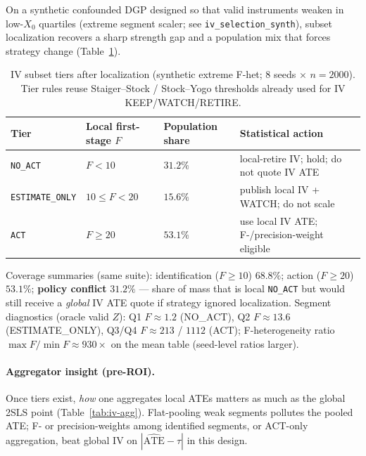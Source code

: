 On a synthetic confounded DGP designed so that valid instruments weaken in
low-$X_0$ quartiles (extreme segment scaler; see
\texttt{iv\_selection\_synth}), subset localization recovers a sharp
strength gap and a population mix that forces strategy change
(Table~\ref{tab:iv-tiers}).

\begin{table}[H]
\centering
\small
\caption{IV subset tiers after localization (synthetic extreme F-het;
8 seeds $\times$ $n{=}2000$). Tier rules reuse Staiger--Stock / Stock--Yogo
thresholds already used for IV KEEP/WATCH/RETIRE.}
\label{tab:iv-tiers}
\begin{tabular}{@{}llll@{}}
\toprule
Tier & Local first-stage $F$ & Population share & Statistical action \\
\midrule
\texttt{NO\_ACT} & $F<10$ & $31.2\%$ & local-retire IV; hold; do not quote IV ATE \\
\texttt{ESTIMATE\_ONLY} & $10\le F<20$ & $15.6\%$ & publish local IV + WATCH; do not scale \\
\texttt{ACT} & $F\ge 20$ & $53.1\%$ & use local IV ATE; F-/precision-weight eligible \\
\bottomrule
\end{tabular}
\end{table}

\noindent Coverage summaries (same suite): identification ($F\ge 10$)
$68.8\%$; action ($F\ge 20$) $53.1\%$;
\textbf{policy conflict} $31.2\%$ --- share of mass that is local
\texttt{NO\_ACT} but would still receive a \emph{global} IV ATE quote if
strategy ignored localization.
Segment diagnostics (oracle valid $Z$): Q1 $F\approx 1.2$ (NO\_ACT),
Q2 $F\approx 13.6$ (ESTIMATE\_ONLY), Q3/Q4 $F\approx 213$ / $1112$ (ACT);
F-heterogeneity ratio $\max F/\min F \approx 930\times$ on the mean table
(seed-level ratios larger).

\paragraph{Aggregator insight (pre-ROI).}
Once tiers exist, \emph{how} one aggregates local ATEs matters as much as
the global 2SLS point (Table~\ref{tab:iv-agg}).
Flat-pooling weak segments pollutes the pooled ATE; F- or precision-weights
among identified segments, or ACT-only aggregation, beat global IV on
$|\widehat{\mathrm{ATE}}-\tau|$ in this design.

